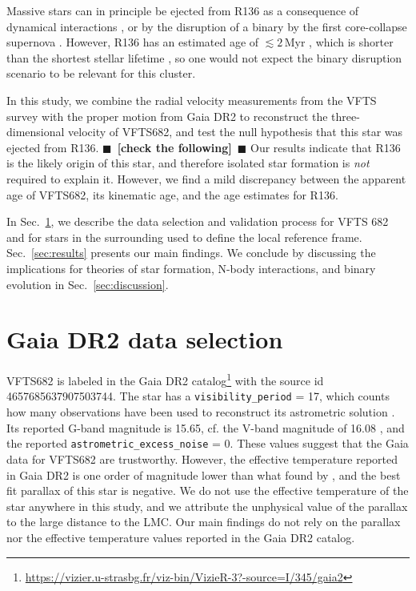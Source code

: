 \documentclass{aa}
\newcommand{\todo}[1]{{\large $\blacksquare$~\textbf{\color{red}[#1]}}~$\blacksquare$}
\DeclareRobustCommand{\Secref}[1]{Sec.~\ref{#1}}
\begin{document}
Massive stars can in principle be ejected from R136 as a consequence of dynamical
interactions \citep[][]{poveda:67,leonard:91, evans:10, fujii:11,
  allison:12, oh:16}, or by the disruption of a binary by the first
core-collapse supernova
\citep[][]{zwicky:57,blaauw:61,dedonder:97,eldridge:11,renzo:18}. However,
R136 has an estimated age of $\lesssim2$\,Myr \citep[][]{sabbi:12}, which is
shorter than the shortest stellar lifetime
\citep[$\sim$3\,Myr, e.g.,][]{zapartas:17}, so one would not expect the binary
disruption scenario to be relevant for this cluster.


In this study, we combine the radial velocity measurements from the
VFTS survey \citep[][]{evans:11} with the proper motion from Gaia DR2
to reconstruct the three-dimensional velocity of VFTS682, and test the
null hypothesis that this star was ejected from R136. \todo{check the
  following} Our results indicate that R136 is the likely origin of
this star, and therefore isolated star formation is \emph{not}
required to explain it. However, we find a mild discrepancy between the
apparent age of VFTS682, its kinematic age, and the age estimates for
R136. 

In \Secref{sec:sample}, we describe the data selection and validation
process for VFTS 682 and for stars in the surrounding used to
define the local reference frame. \Secref{sec:results} presents our main findings. We conclude
by discussing the implications for theories of
star formation, N-body interactions, and binary evolution in
\Secref{sec:discussion}.

\section{Gaia DR2 data selection}
\label{sec:sample}

VFTS682 is labeled in the Gaia DR2
catalog\footnote{\url{https://vizier.u-strasbg.fr/viz-bin/VizieR-3?-source=I/345/gaia2}} with the
source id 4657685637907503744. The star has a
\texttt{visibility\_period} = 17, which counts how many observations have
been used to reconstruct its astrometric solution
\citep[][]{lindengren:18}. Its reported G-band
magnitude is 15.65, cf. the V-band magnitude of 16.08
\citep[][]{evans:11, bestenlehner:11}, and the reported
\texttt{astrometric\_excess\_noise} = 0. These values suggest that the Gaia
data for VFTS682 are trustworthy. However, the effective temperature
reported in Gaia DR2 is one order of magnitude lower than what found by
\cite{bestenlehner:11}, and the best fit parallax of this star is
negative. We do not use the effective temperature of the star anywhere
in this study, and we attribute the unphysical value of the parallax
to the large distance to the LMC. Our main findings do not rely on the
parallax nor the effective temperature values reported in the Gaia DR2
catalog.
\end{document}

